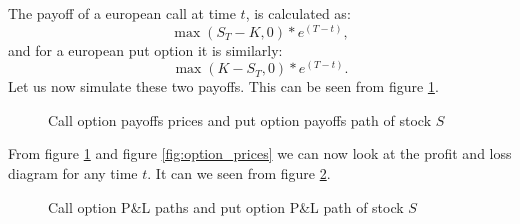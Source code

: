 \documentclass[a4paper, 12pt]{article}
\theoremstyle{definition}
\theoremstyle{plain}
\theoremstyle{definition}
\begin{document}
The payoff of a european call at time $t$, is 
calculated as: 
$$ 
\max (S_T - K, 0) * e^(T-t), 
$$
and for a european put option it is similarly:
$$ 
\max (K - S_T, 0) * e^(T-t). 
$$
Let us now simulate these two payoffs.
This can be seen from figure \ref{fig:option_payoff}.

\begin{figure}[ht!]
    \centering

    \caption{Call option payoffs prices 
            and put option payoffs path of stock $S$}
 \label{fig:option_payoff}
 \end{figure}

From figure \ref{fig:option_payoff}
and figure \ref{fig:option_prices}
we can now look at the profit and loss diagram for 
any time $t$.
It can we seen from figure \ref{fig:optionpl}.

\begin{figure}[ht!]
    \centering

    \caption{Call option P\&L paths 
            and put option P\&L path of stock $S$}
 \label{fig:optionpl}
 \end{figure}
\end{document}
